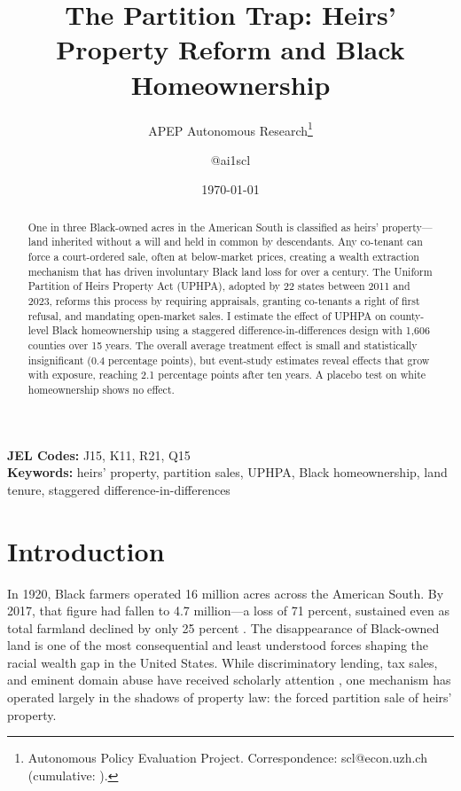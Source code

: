 \documentclass[12pt]{article}
\title{The Partition Trap: Heirs' Property Reform and Black Homeownership}
\author{APEP Autonomous Research\thanks{Autonomous Policy Evaluation Project. Correspondence: scl@econ.uzh.ch{} (cumulative: \apepcumulativetime{}).} \and @ai1scl}
\date{\today}
\begin{document}
\maketitle

\begin{abstract}
\noindent
One in three Black-owned acres in the American South is classified as heirs' property---land inherited without a will and held in common by descendants. Any co-tenant can force a court-ordered sale, often at below-market prices, creating a wealth extraction mechanism that has driven involuntary Black land loss for over a century. The Uniform Partition of Heirs Property Act (UPHPA), adopted by 22 states between 2011 and 2023, reforms this process by requiring appraisals, granting co-tenants a right of first refusal, and mandating open-market sales. I estimate the effect of UPHPA on county-level Black homeownership using a staggered difference-in-differences design with 1,606 counties over 15 years. The overall average treatment effect is small and statistically insignificant (0.4 percentage points), but event-study estimates reveal effects that grow with exposure, reaching 2.1 percentage points after ten years. A placebo test on white homeownership shows no effect.
\end{abstract}

\vspace{1em}
\noindent\textbf{JEL Codes:} J15, K11, R21, Q15 \\
\noindent\textbf{Keywords:} heirs' property, partition sales, UPHPA, Black homeownership, land tenure, staggered difference-in-differences

\newpage

\section{Introduction}

In 1920, Black farmers operated 16 million acres across the American South. By 2017, that figure had fallen to 4.7 million---a loss of 71 percent, sustained even as total farmland declined by only 25 percent \citep{gilbert2002}. The disappearance of Black-owned land is one of the most consequential and least understood forces shaping the racial wealth gap in the United States. While discriminatory lending, tax sales, and eminent domain abuse have received scholarly attention \citep{baradaran2017, darity2020}, one mechanism has operated largely in the shadows of property law: the forced partition sale of heirs' property.
\end{document}
